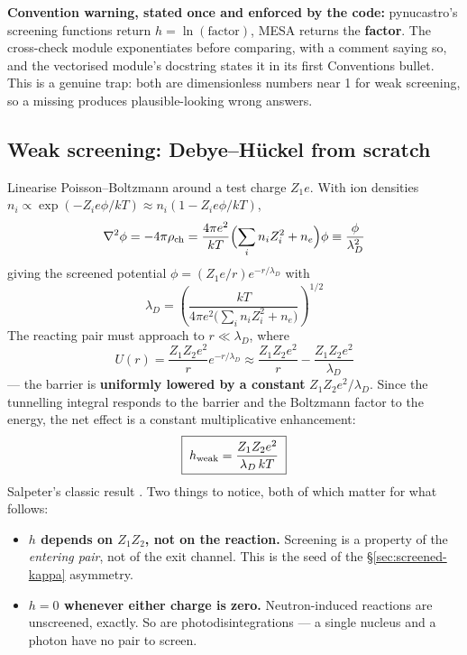 \begin{warn}
\textbf{Convention warning, stated once and enforced by the code:} pynucastro's
screening functions return \textbf{$h = \ln(\text{factor})$}, MESA returns the
\textbf{factor}. The cross-check module exponentiates before comparing, with a
comment saying so, and the vectorised module's docstring states it in its first
Conventions bullet. This is a genuine trap: both are dimensionless numbers near
1 for weak screening, so a missing  produces plausible-looking wrong
answers.
\end{warn}

\subsection{Weak screening: Debye--H\"uckel from scratch}
\label{sec:debye}

Linearise Poisson--Boltzmann around a test charge $Z_1e$. With ion densities
$n_i \propto \exp(-Z_ie\phi/kT) \approx n_i(1 - Z_ie\phi/kT)$,
%
\begin{equation*}
\nabla^2\phi = -4\pi\rho_{\rm ch}
= \frac{4\pi e^2}{kT}\Bigl(\sum_i n_i Z_i^2 + n_e\Bigr)\phi
\equiv \frac{\phi}{\lambda_D^2}
\end{equation*}
%
giving the screened potential $\phi = (Z_1e/r)e^{-r/\lambda_D}$ with
%
\begin{equation*}
\lambda_D = \left(\frac{kT}{4\pi e^2\bigl(\sum_i n_i Z_i^2 + n_e\bigr)}\right)^{1/2}
\end{equation*}
%
The reacting pair must approach to $r \ll \lambda_D$, where
%
\begin{equation*}
U(r) = \frac{Z_1Z_2e^2}{r}e^{-r/\lambda_D}
\approx \frac{Z_1Z_2e^2}{r} - \frac{Z_1Z_2e^2}{\lambda_D}
\end{equation*}
%
--- the barrier is \textbf{uniformly lowered by a constant}
$Z_1Z_2e^2/\lambda_D$. Since the tunnelling integral responds to the barrier and
the Boltzmann factor to the energy, the net effect is a constant multiplicative
enhancement:
%
\begin{equation}
\boxed{\;h_{\rm weak} = \frac{Z_1Z_2 e^2}{\lambda_D\,kT}\;}
\label{eq:debye}
\end{equation}
%
Salpeter's classic result \citep[eq.~21]{salpeter1954}. Two things to notice,
both of which matter for what follows:

\begin{itemize}
\item \textbf{$h$ depends on $Z_1Z_2$, not on the reaction.} Screening is a
      property of the \emph{entering pair}, not of the exit channel. This is the
      seed of the \S\ref{sec:screened-kappa} asymmetry.
\item \textbf{$h = 0$ whenever either charge is zero.} Neutron-induced reactions
      are unscreened, exactly. So are photodisintegrations --- a single nucleus
      and a photon have no pair to screen.
\end{itemize}

